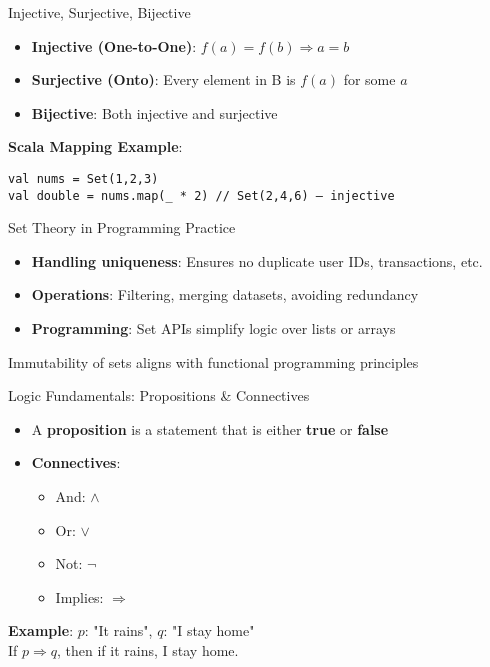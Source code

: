 \documentclass{beamer}
\begin{document}
\begin{frame}{Injective, Surjective, Bijective}
\begin{itemize}
    \item \textbf{Injective (One-to-One)}: $f(a)=f(b) \Rightarrow a=b$
    \item \textbf{Surjective (Onto)}: Every element in B is $f(a)$ for some $a$
    \item \textbf{Bijective}: Both injective and surjective
\end{itemize}

\textbf{Scala Mapping Example}:
\begin{lstlisting}
val nums = Set(1,2,3)
val double = nums.map(_ * 2) // Set(2,4,6) – injective
\end{lstlisting}
\end{frame}

\begin{frame}{Set Theory in Programming Practice}
\begin{itemize}
    \item \textbf{Handling uniqueness}: Ensures no duplicate user IDs, transactions, etc.
    \item \textbf{Operations}: Filtering, merging datasets, avoiding redundancy
    \item \textbf{Programming}: Set APIs simplify logic over lists or arrays
\end{itemize}
Immutability of sets aligns with functional programming principles
\end{frame}

\begin{frame}{Logic Fundamentals: Propositions \& Connectives}
\begin{itemize}
    \item A \textbf{proposition} is a statement that is either \textbf{true} or \textbf{false}
    \item \textbf{Connectives}:
    \begin{itemize}
        \item And: $\wedge$
        \item Or: $\vee$
        \item Not: $\neg$
        \item Implies: $\Rightarrow$
    \end{itemize}
\end{itemize}

\textbf{Example}: $p$: "It rains", $q$: "I stay home"\\
If $p \Rightarrow q$, then if it rains, I stay home.
\end{frame}
\end{document}
